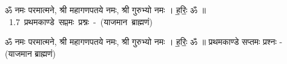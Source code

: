 \documentclass[17pt]{extarticle}
\begin{document}
\begin{titlepage}
    \begin{center}
 
\begin{sanskrit}
    { \Large
    ॐ नमः परमात्मने, श्री महागणपतये नमः, 
श्री गुरुभ्यो नमः । ह॒रिः॒ ॐ ॥ 
    }
    \\
    \vspace{2.5cm}
    \mbox{ \Huge
    1.7     प्रथमकाण्डे सप्तमः प्रश्नः - (याजमान ब्राह्मणं)   }
\end{sanskrit}
\end{center}

\end{titlepage}
\tableofcontents

ॐ नमः परमात्मने, श्री महागणपतये नमः, 
श्री गुरुभ्यो नमः । ह॒रिः॒ ॐ ॥      प्रथमकाण्डे सप्तमः प्रश्नः - (याजमान ब्राह्मणं) \newline

\end{document}

